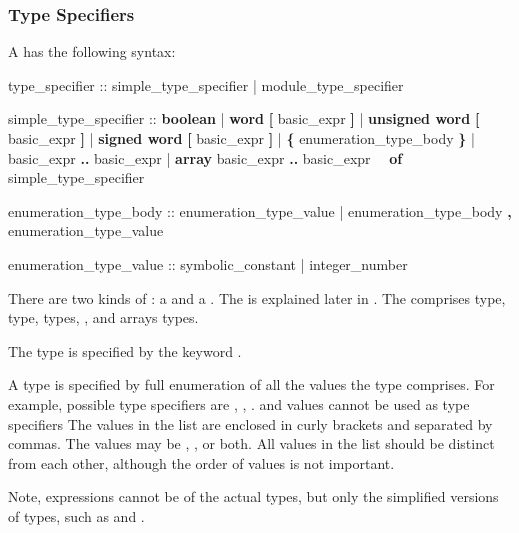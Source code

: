 \subsubsection{Type Specifiers}
\label{Type Specifiers}
%
A  has the following syntax:
%
\begin{Grammar}
type_specifier ::
        simple_type_specifier
      | module_type_specifier

simple_type_specifier :: 
        \textbf{boolean}
      | \textbf{word} \textbf{[} basic_expr \textbf{]} 
      | \textbf{unsigned word} \textbf{[} basic_expr \textbf{]} 
      | \textbf{signed word} \textbf{[} basic_expr \textbf{]} 
      | \textbf{\{} enumeration_type_body \textbf{\}}
      | basic_expr \textbf{..} basic_expr
      | \textbf{array} basic_expr \textbf{..} basic_expr
        \ \ \textbf{of} simple_type_specifier

enumeration_type_body ::
        enumeration_type_value
      | enumeration_type_body \textbf{,} enumeration_type_value

enumeration_type_value ::
        symbolic_constant
      | integer_number
\end{Grammar}
% 
There are two kinds of : a  and a . 
%
The  is explained later in
.
%
The  comprises \Boolean type, \Integer
type, \Enum types, \UWord, \SWord and arrays 
types.

The \Boolean type is specified by the keyword . 

A \Enum type is specified by full enumeration of all the values the
type comprises. 
%
For example, possible \Enum type specifiers are ,
, .  and 
 values cannot be used as \Enum type specifiers
%
The values in the list are enclosed in curly brackets and separated by
commas.
%
The values may be , , or both.
%
All values in the list should be distinct from each other, although the
order of values is not important. 

Note, expressions cannot be of the actual \Enum types, but only the
simplified versions of \Enum types, such as \SymbEnum and \IntSymbEnum.

